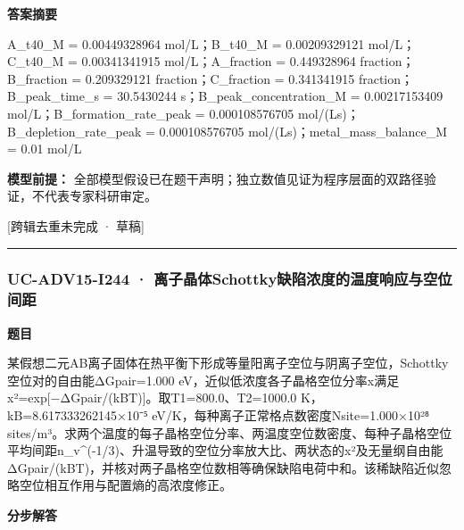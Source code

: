 \documentclass[UTF8,11pt,a4paper]{ctexart}
\begin{document}
\noindent\textbf{答案摘要}\par
A\_t40\_M = 0.00449328964 mol/L；B\_t40\_M = 0.00209329121 mol/L；C\_t40\_M = 0.00341341915 mol/L；A\_fraction = 0.449328964 fraction；B\_fraction = 0.209329121 fraction；C\_fraction = 0.341341915 fraction；B\_peak\_time\_s = 30.5430244 s；B\_peak\_concentration\_M = 0.00217153409 mol/L；B\_formation\_rate\_peak = 0.000108576705 mol/(Ls)；B\_depletion\_rate\_peak = 0.000108576705 mol/(Ls)；metal\_mass\_balance\_M = 0.01 mol/L\par
\noindent\textbf{模型前提：}
全部模型假设已在题干声明；独立数值见证为程序层面的双路径验证，不代表专家科研审定。\par
\noindent\textcolor{red!65!black}{[跨辑去重未完成 · 草稿]} \par
\medskip\hrule\medskip
{}
\subsubsection*{UC-ADV15-I244 · 离子晶体Schottky缺陷浓度的温度响应与空位间距}
\noindent\textbf{题目}\par
某假想二元AB离子固体在热平衡下形成等量阳离子空位与阴离子空位，Schottky空位对的自由能ΔGpair=1.000 eV，近似低浓度各子晶格空位分率x满足x²=exp[−ΔGpair/(kBT)]。取T1=800.0、T2=1000.0 K，kB=8.617333262145×10⁻⁵ eV/K，每种离子正常格点数密度Nsite=1.000×10²⁸ sites/m³。求两个温度的每子晶格空位分率、两温度空位数密度、每种子晶格空位平均间距n\_v\textasciicircum{}(-1/3)、升温导致的空位分率放大比、两状态的x²及无量纲自由能ΔGpair/(kBT)，并核对两子晶格空位数相等确保缺陷电荷中和。该稀缺陷近似忽略空位相互作用与配置熵的高浓度修正。\par
\medskip\noindent\textbf{分步解答}
\end{document}
